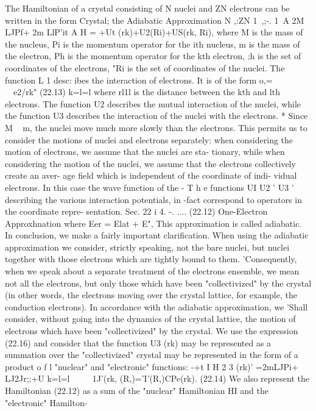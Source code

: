 \documentclass[a4paper,sfsidenotes,colorlinks=true]{tufte-book}
\numberwithin{equation}{section}
\numberwithin{figure}{section}
\begin{document}
{{{{{The Hamiltonian of a crystal consisting of N nuclei and ZN electrons can be written in the form
Crystal; the Adiabatic Approximation
N ,:ZN 1~,;-. 1~A
2M LJPf+ 2m LlP'it
A
H =
+Ut ({rk})+U2({Ri})+US({rk}, {Ri}), where M is the mass of the nucleus, Pi is the momentum
operator for the ith nucleus, m is the mass of the electron, Ph is the momentum operator for the kth electron, {;h}
is the set of coordinates of the electrons, {"Ri} is the set of coordinates of the nuclei. The function L 1 desc: ibes the interaction of electrons. It is of the form
o,=	~ ~~e2/rk"	(22.13) k=l=l
where rl1l is the distance between the kth and lth electrons. The function U2 describes the mutual interaction of the nuclei, while the function U3 describes the interaction of	the	nuclei	with	the	electrons. *
Since M ~ m, the nuclei move much more slowly than the electrons. This permits us to consider the motions of nuclei and electrons separately: when considering the motion of electrons, we assume that the nuclei are sta- tionary, while when considering the motion of the nuclei, we assume that the electrons collectively create an aver- age field which is independent of the coordinate of indi- vidual electrons. In this case the wave function of the
- T h e	functions	UI 	U2 '	U3 '	describing	the	various	interaction potentials, in -fact correspond to operators in the coordinate repre- sentation.
Sec. 22
i
4. -. ....
(22.12)
One-Electron Approxhnation
where Eer = Elat + E", This approximation is called adiabatic.
In conclusion, we make a fairly important clarification. When using the adiabatic approximation we consider, strictly speaking, not the bare nuclei, but nuclei together with those electrons which are tightly bound to them. 'Consequently, when we speak about a separate treatment of the electrons ensemble, we mean not all the electrons, but only those which have been "collectivized" by the crystal (in other words, the electrons moving over the crystal lattice, for example, the conduction electrons).
In accordance with the adiabatic approximation, we 'Shall consider, without going into the dynamics of the crystal lattice, the motion of electrons which have been
"collectivized" by the crystal. We use the expression
~
(22.16) and consider that the function U3 ({rk}) may be represented as a summation over the "collectivized"
crystal may be represented in the form of a product o f l "nuclear" and "electronic" functions:	-+t
I
H 2
3 ({rk})' =2mLJPi+ LJ2Jr;;+U
k=l=l
~~~~
1J'({rk}, (R,})='I'({R,})CPe({rk}).	(22.14)
We also represent the Hamiltonian (22.12) as a sum of the "nuclear" Hamiltonian HI and the "electronic" Hamilton-
}}}}
\end{document}
